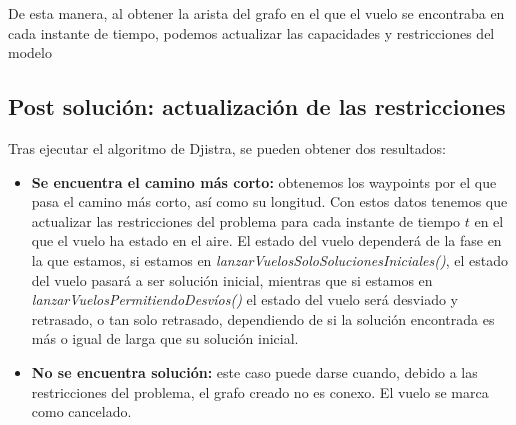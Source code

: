 De esta manera, al obtener la arista del grafo en el que el vuelo se encontraba en cada instante de tiempo, podemos actualizar las capacidades y restricciones del modelo

\subsection{Post solución: actualización de las restricciones}
Tras ejecutar el algoritmo de Djistra, se pueden obtener dos resultados:
\begin{itemize}
	\item \textbf{Se encuentra el camino más corto:} obtenemos los waypoints por el que pasa el camino más corto, así como su longitud. Con estos datos tenemos que actualizar las restricciones del problema para cada instante de tiempo $t$ en el que el vuelo ha estado en el aire. El estado del vuelo dependerá de la fase en la que estamos, si estamos en \textit{lanzarVuelosSoloSolucionesIniciales()}, el estado del vuelo pasará a ser solución inicial, mientras que si estamos en \textit{lanzarVuelosPermitiendoDesvíos()} el estado del vuelo será desviado y retrasado, o tan solo retrasado, dependiendo de si la solución encontrada es más o igual de larga que su solución inicial.
	\item \textbf{No se encuentra solución:} este caso puede darse cuando, debido a las restricciones del problema, el grafo creado no es conexo. El vuelo se marca como cancelado.
\end{itemize}
